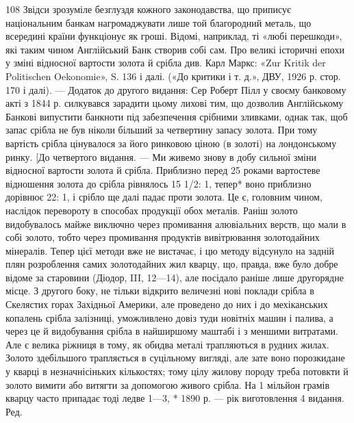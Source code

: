 108 Звідси зрозуміле безглуздя кожного законодавства, що приписує
національним банкам нагромаджувати лише той благородний металь,
що всередині країни функціонує як гроші. Відомі, наприклад, ті «любі
перешкоди», які таким чином Англійський Банк створив собі сам. Про
великі історичні епохи у зміні відносної вартости золота й срібла див.
Карл Маркс: «Zur Kritik der Politischen Oekonomie», S. 136 і далі. («До
критики і т. д.», ДВУ, 1926 р. стор. 170 і далі). — Додаток до другого видання:
Сер Роберт Пілл у своєму банковому акті з 1844 р. силкувався зарадити
цьому лихові тим, що дозволив Англійському Банкові випустити банкноти
під забезпечення срібними зливками, однак так, щоб запас срібла
не був ніколи більший за четвертину запасу золота. При тому вартість
срібла цінувалося за його ринковою ціною (в золоті) на лондонському
ринку. [До четвертого видання. — Ми живемо знову в добу сильної зміни
відносної вартости золота й срібла. Приблизно перед 25 роками вартостеве
відношення золота до срібла рівнялось 15 1/2: 1, тепер* воно приблизно
дорівнює 22: 1, і срібло ще далі падає проти золота. Це є, головним чином,
наслідок перевороту в способах продукції обох металів. Раніш золото
видобувалось майже виключно через промивання алювіальних
верств, що мали в собі золото, тобто через промивання продуктів вивітрювання
золотодайних мінералів. Тепер цієї методи вже не вистачає,
і цю методу відсунуло на задній плян розроблення самих золотодайних
жил кварцу, що, правда, вже було добре відоме за старовини (Діодор, III,
12—14), але посідало раніше лише другорядне місце. З другого боку, не
тільки відкрито величезні нові поклади срібла в Скелястих горах Західньої
Америки, але проведено до них і до мехіканських копалень срібла
залізниці, уможливлено довіз туди новітніх машин і палива, а через це
й видобування срібла в найширшому маштабі і з меншими витратами.
Але є велика ріжниця в тому, як обидва металі трапляються в рудних
жилах. Золото здебільшого трапляється в суцільному вигляді, але зате воно
порозкидане у кварці в незначнісіньких кількостях; тому цілу жилову
породу треба потовкти й золото вимити або витягти за допомогою живого
срібла. На 1 мільйон грамів кварцу часто припадає тоді ледве 1—3,
* 1890 р. — рік виготовлення 4 видання. Ред.
